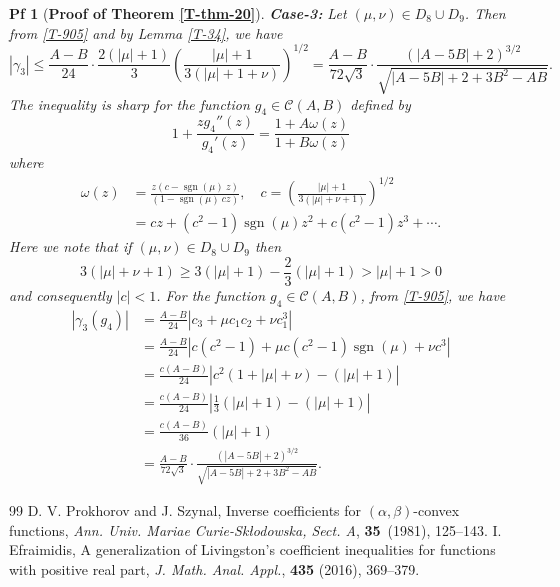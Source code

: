 \documentclass[10pt,a4paper]{amsart}
\newtheorem{pf}{Pf}
\begin{document}
\begin{pf}[\textbf{Proof of Theorem \ref{T-thm-20}}]
\textbf{Case-3:} Let $(\mu,\nu)\in D_8\cup D_9$. Then from \eqref{T-905} and by Lemma \ref{T-34}, we have
$$
|\gamma_3|
\le \frac{A-B}{24}\cdot \frac{2\left( |\mu| + 1 \right)}{3}  \left( \frac{|\mu| + 1}{3(|\mu| + 1 +\nu)} \right)^{1/2}
= \frac{A-B}{72\sqrt{3}} \cdot \frac{\left( |A - 5B| + 2 \right)^{3/2}}{\sqrt{|A - 5B| + 2 + 3B^{2} - AB}}.
$$
The inequality is sharp for the function $g_4\in\mathcal{C}(A,B)$ defined by
$$
1 + \frac{zg_4''(z)}{g_4'(z)} = \frac{1+A\omega(z)}{1+B\omega(z)}
$$
where
\begin{align*}
\omega(z)
&=\frac{z(c-\operatorname{sgn} (\mu)~ z)}{(1-\operatorname{sgn} (\mu)~cz)}, \quad c=\left( \frac{|\mu|+1}{3(|\mu|+\nu+1)}\right)^{1/2}\\[3mm]
&= cz+(c^2-1)\operatorname{sgn} (\mu) z^2+c(c^2-1)z^3+\cdots.
\end{align*}
Here we note that if $(\mu,\nu)\in D_8\cup D_9$ then
$$
3(|\mu|+\nu+1)\ge 3(|\mu|+1)-\frac{2}{3}(|\mu|+1)> |\mu|+1>0
$$
and consequently $|c|<1$. For the function $g_4\in\mathcal{C}(A,B)$, from \eqref{T-905}, we have
\begin{align*}
|\gamma_3(g_4)|
&= \frac{A-B}{24}\left|c_3+\mu c_{1}c_{2}+\nu c_1^3\right|\\
&=\frac{A-B}{24}\left|c(c^2-1)+\mu c(c^2-1)\operatorname{sgn} (\mu) +\nu c^3\right|\\
&=\frac{c(A-B)}{24}\left|c^2(1+|\mu|+\nu)-(|\mu|+1)\right|\\
&=\frac{c(A-B)}{24}\left|\frac{1}{3}(|\mu|+1)-(|\mu|+1)\right|\\
&=\frac{c(A-B)}{36}(|\mu|+1)\\
&= \frac{A-B}{72\sqrt{3}} \cdot \frac{\left( |A - 5B| + 2 \right)^{3/2}}{\sqrt{|A - 5B| + 2 + 3B^{2} - AB}}.
\end{align*}


\end{pf}

\begin{thebibliography}{99}
 {\sc D. V. Prokhorov and J. Szynal}, Inverse coefficients for $(\alpha, \beta)$-convex functions, \textit{Ann. Univ. Mariae Curie-Sk\l odowska, Sect. A}, \textbf{35}~(1981), 125--143.
 {\sc I. Efraimidis}, A generalization of Livingston’s coefficient inequalities for functions with positive real part, \textit{J. Math. Anal. Appl.}, \textbf{435} (2016), 369--379.
\end{thebibliography}
\end{document}
